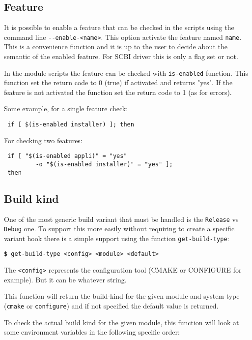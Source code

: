 \documentclass[a4paper,12pt,twoside]{article}
\newcommand{\code}[1]{\texttt{#1}}
\newcommand{\cmd}[1]{\tabto{1cm}\hspace{0.5cm}\texttt{\textbf{\$} #1}}
\newcommand{\ddash}{-{}-}
\begin{document}
\subsection{Feature}
\label{enable-feature}

It is possible to enable a feature that can be checked in the scripts using the command line \code{\ddash{}enable-<name>}. This option activate the feature named \code{name}. This is a convenience function and it is up to the user to decide about the semantic of the enabled feature. For SCBI driver this is only a flag set or not.

In the module scripts the feature can be checked with \code{is-enabled} function. This function set the return code to 0 (true) if activated and returns "yes". If the feature is not activated the function set the return code to 1 (as for errors).

Some example, for a single feature check:

\begin{lstlisting}
 if [ $(is-enabled installer) ]; then
\end{lstlisting}

For checking two features:

\begin{lstlisting}
 if [ "$(is-enabled appli)" = "yes"
         -o "$(is-enabled installer)" = "yes" ];
 then
\end{lstlisting}

\subsection{Build kind}

One of the most generic build variant that must be handled is the \code{Release} vs \code{Debug} one. To support this more easily without requiring to create a specific variant hook there is a simple support using the function \code{get-build-type}:

\cmd{get-build-type <config> <module> <default>}

The \code{<config>} represents the configuration tool (CMAKE or CONFIGURE for example). But it can be whatever string.

This function will return the build-kind for the given module and system type (\code{cmake} or \code{configure}) and if not specified the default value is returned.

To check the actual build kind for the given module, this function will look at some environment variables in the following specific order:
\end{document}
